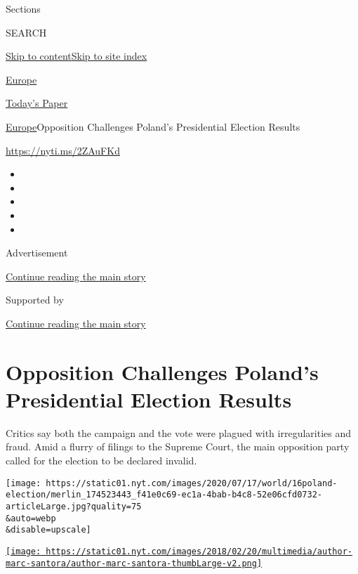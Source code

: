 Sections

SEARCH

\protect\hyperlink{site-content}{Skip to
content}\protect\hyperlink{site-index}{Skip to site index}

\href{https://www.nytimes.com/section/world/europe}{Europe}

\href{https://myaccount.nytimes.com/auth/login?response_type=cookie\&client_id=vi}{}

\href{https://www.nytimes.com/section/todayspaper}{Today's Paper}

\href{/section/world/europe}{Europe}\textbar{}Opposition Challenges
Poland's Presidential Election Results

\url{https://nyti.ms/2ZAuFKd}

\begin{itemize}
\item
\item
\item
\item
\item
\end{itemize}

Advertisement

\protect\hyperlink{after-top}{Continue reading the main story}

Supported by

\protect\hyperlink{after-sponsor}{Continue reading the main story}

\hypertarget{opposition-challenges-polands-presidential-election-results}{%
\section{Opposition Challenges Poland's Presidential Election
Results}\label{opposition-challenges-polands-presidential-election-results}}

Critics say both the campaign and the vote were plagued with
irregularities and fraud. Amid a flurry of filings to the Supreme Court,
the main opposition party called for the election to be declared
invalid.

\texttt{[image: https://static01.nyt.com/images/2020/07/17/world/16poland-election/merlin\_174523443\_f41e0c69-ec1a-4bab-b4c8-52e06cfd0732-articleLarge.jpg?quality=75\\\&auto=webp\\\&disable=upscale]}

\href{https://www.nytimes.com/by/marc-santora}{\texttt{[image: https://static01.nyt.com/images/2018/02/20/multimedia/author-marc-santora/author-marc-santora-thumbLarge-v2.png]}}

